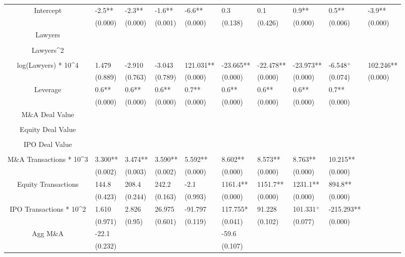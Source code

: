 \documentclass{article}
\begin{document}
\begin{table}[H]
\begin{tabular}{|clllllllll|}
Intercept & -2.5** & -2.3** & -1.6** & -6.6** & 0.3 & 0.1 & 0.9** & 0.5** & -3.9** \\
   & (0.000) & (0.000) & (0.001) & (0.000) & (0.138) & (0.426) & (0.000) & (0.006) & (0.000) \\
  Lawyers &  &  &  &  &  &  &  &  &  \\
   &  &  &  &  &  &  &  &  &  \\
  Lawyers^2 &  &  &  &  &  &  &  &  &  \\
   &  &  &  &  &  &  &  &  &  \\
  log(Lawyers) * 10^4 & 1.479 & -2.910 & -3.043 & 121.031** & -23.665** & -22.478** & -23.973** & -6.548$^{+}$ & 102.246** \\
   & (0.889) & (0.763) & (0.789) & (0.000) & (0.000) & (0.000) & (0.000) & (0.074) & (0.000) \\
  Leverage & 0.6** & 0.6** & 0.6** & 0.7** & 0.6** & 0.6** & 0.6** & 0.7** &  \\
   & (0.000) & (0.000) & (0.000) & (0.000) & (0.000) & (0.000) & (0.000) & (0.000) &  \\
  M\&A Deal Value &  &  &  &  &  &  &  &  &  \\
   &  &  &  &  &  &  &  &  &  \\
  Equity Deal Value &  &  &  &  &  &  &  &  &  \\
   &  &  &  &  &  &  &  &  &  \\
  IPO Deal Value &  &  &  &  &  &  &  &  &  \\
   &  &  &  &  &  &  &  &  &  \\
  M\&A Transactions * 10^3 & 3.300** & 3.474** & 3.590** & 5.592** & 8.602** & 8.573** & 8.763** & 10.215** &  \\
   & (0.002) & (0.003) & (0.002) & (0.000) & (0.000) & (0.000) & (0.000) & (0.000) &  \\
  Equity Transactions & 144.8 & 208.4 & 242.2 & -2.1 & 1161.4** & 1151.7** & 1231.1** & 894.8** &  \\
   & (0.423) & (0.244) & (0.163) & (0.993) & (0.000) & (0.000) & (0.000) & (0.000) &  \\
  IPO Transactions * 10^2 & 1.610 & 2.826 & 26.975 & -91.797 & 117.755* & 91.228 & 101.331$^{+}$ & -215.293** &  \\
   & (0.971) & (0.95) & (0.601) & (0.119) & (0.041) & (0.102) & (0.077) & (0.000) &  \\
  Agg M\&A & -22.1 &  &  &  & -59.6 &  &  &  &  \\
   & (0.232) &  &  &  & (0.107) &  &  &  &  \\

\end{tabular}
\end{table}
\end{document}
